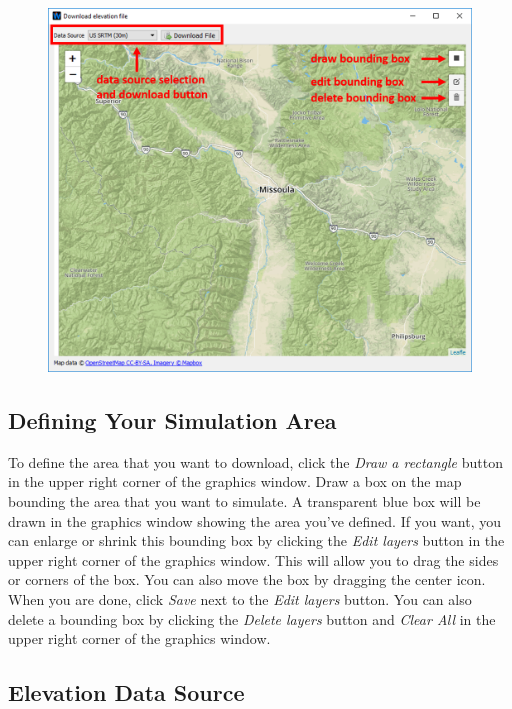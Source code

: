 \documentclass[12pt]{article}
\begin{document}
\begin{figure}[H]
	\centering
	\label{}
	\includegraphics[scale=0.75]{dem_download_1}
\end{figure}

\subsection*{Defining Your Simulation Area}

To define the area that you want to download, click the \textit{Draw a rectangle} button in the upper right corner of the graphics window. Draw a box on the map bounding the area that you want to simulate. A transparent blue box will be drawn in the graphics window showing the area you've defined.  If you want, you can enlarge or shrink this bounding box by clicking the \textit{Edit layers} button in the upper right corner of the graphics window. This will allow you to drag the sides or corners of the box. You can also move the box by dragging the center icon. When you are done, click \textit{Save} next to the \textit{Edit layers} button. You can also delete a bounding box by clicking the \textit{Delete layers} button and  \textit{Clear All} in the upper right corner of the graphics window. 

\subsection*{Elevation Data Source}
\end{document}
